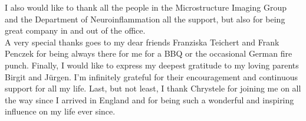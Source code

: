 \noindent
I also would like to thank all the people in the Microstructure Imaging Group and the Department of Neuroinflammation all the support, but also for being great company in and out of the office. \\

\noindent
A very special thanks goes to my dear friends Franziska Teichert and Frank Penczek for being always there for me for a BBQ or the occasional German fire punch. 
Finally, I would like to express my deepest gratitude to my loving parents Birgit and J\"urgen. I'm infinitely grateful for their encouragement and continuous support for all my life. Last, but not least, I thank Chrystele for joining me on all the way since I arrived in England and for being such a wonderful and inspiring influence on my life ever since.

\endgroup